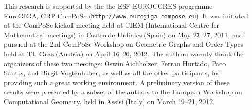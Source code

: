 \documentclass[11pt,a4paper]{amsart}
\theoremstyle{plain}
\theoremstyle{definition}
\begin{document}
This research is supported by the the ESF EUROCORES programme EuroGIGA, CRP ComPoSe ({\tt http://www.eurogiga-compose.eu}).
It was initiated at the ComPoSe kickoff meeting held at CIEM (International Centre for Mathematical meetings) in Castro de Urdiales (Spain) on May 23--27, 2011, and pursued
at the 2nd ComPoSe Workshop on Geometric Graphs and Order Types held at TU Graz (Austria) on April 16--20, 2012. The authors warmly thank the organizers of these two meetings: 
Oswin Aichholzer, Ferran Hurtado, Paco Santos, and Birgit Vogtenhuber, as well as all the other participants, for providing such a great working environment. A preliminary version
of these results were presented by a subset of the authors to the European Workshop on Computational Geometry, held in Assisi (Italy) on March 19--21, 2012.

\small


\end{document}
